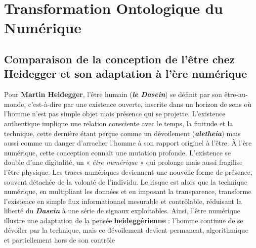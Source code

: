 \documentclass[12pt,a4paper]{article}
\begin{document}
	\section{Transformation Ontologique du Numérique}
	\subsection{Comparaison de la conception de l'être chez Heidegger et son adaptation à l'ère numérique}
	\vspace{0.5cm}
	Pour \textbf{Martin Heidegger}, l’être humain (\textbf{\emph{le Dasein}}) se définit par son être-au-monde, c’est-à-dire par une existence ouverte, inscrite dans un horizon de sens où l’homme n’est pas simple objet mais présence qui se projette. L’existence authentique implique une relation consciente avec le temps, la finitude et la technique, cette dernière étant perçue comme un dévoilement (\textbf{\emph{aletheia}}) mais aussi comme un danger d’arracher l’homme à son rapport originel à l’être. À l’ère numérique, cette conception connaît une mutation profonde. L’existence se double d’une digitalité, un «\emph{ être numérique} » qui prolonge mais aussi fragilise l’être physique. Les traces numériques deviennent une nouvelle forme de présence, souvent détachée de la volonté de l’individu. Le risque est alors que la technique numérique, en multipliant les données et en imposant la transparence, transforme l’existence en simple flux informationnel mesurable et contrôlable, réduisant la liberté du \textbf{\emph{Dasein}} à une série de signaux exploitables. Ainsi, l’être numérique illustre une adaptation de la pensée \textbf{heideggérienne} : l’homme continue de se dévoiler par la technique, mais ce dévoilement devient permanent, algorithmique et partiellement hors de son contrôle
	
\end{document}
